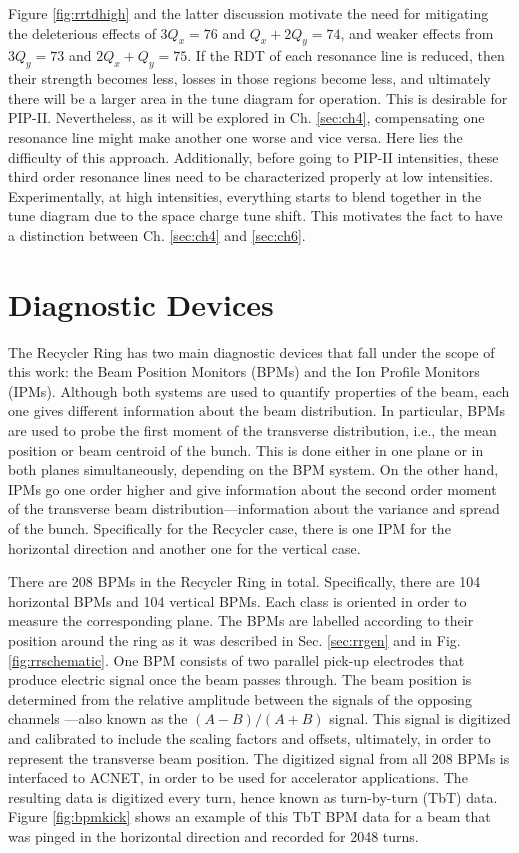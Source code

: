 Figure \ref{fig:rrtdhigh} and the latter discussion motivate the need for mitigating the deleterious effects of $3 Q_x=76$ and $Q_x+2Q_y=74$, and weaker effects from $3 Q_y=73$ and $2 Q_x+Q_y=75$. If the RDT of each resonance line is reduced, then their strength becomes less, losses in those regions become less, and ultimately there will be a larger area in the tune diagram for operation. This is desirable for PIP-II. Nevertheless, as it will be explored in Ch. \ref{sec:ch4}, compensating one resonance line might make another one worse and vice versa. Here lies the difficulty of this approach. Additionally, before going to PIP-II intensities, these third order resonance lines need to be characterized properly at low intensities. Experimentally, at high intensities, everything starts to blend together in the tune diagram due to the space charge tune shift. This motivates the fact to have a distinction between Ch. \ref{sec:ch4} and \ref{sec:ch6}.    

\section{\label{sec:diagnostic}Diagnostic Devices}

The Recycler Ring has two main diagnostic devices that fall under the scope of this work: the Beam Position Monitors (BPMs) and the Ion Profile Monitors (IPMs). Although both systems are used to quantify properties of the beam, each one gives different information about the beam distribution. In particular, BPMs are used to probe the first moment of the transverse distribution, i.e., the mean position or beam centroid of the bunch. This is done either in one plane or in both planes simultaneously, depending on the BPM system. On the other hand, IPMs go one order higher and give information about the second order moment of the transverse beam distribution---information about the variance and spread of the bunch. Specifically for the Recycler case, there is one IPM for the horizontal direction and another one for the vertical case.

There are 208 BPMs in the Recycler Ring in total. Specifically, there are 104 horizontal BPMs and 104 vertical BPMs. Each class is oriented in order to measure the corresponding plane. The BPMs are labelled according to their position around the ring as it was described in Sec. \ref{sec:rrgen} and in Fig. \ref{fig:rrschematic}. One BPM consists of two parallel pick-up electrodes that produce electric signal once the beam passes through. The beam position is determined from the relative amplitude between the signals of the opposing channels \cite{rrbpms}---also known as the $(A-B)/(A+B)$ signal. This signal is digitized and calibrated to include the scaling factors and offsets, ultimately, in order to represent the transverse beam position. The digitized signal from all 208 BPMs is interfaced to ACNET, in order to be used for accelerator applications. The resulting data is digitized every turn, hence known as turn-by-turn (TbT) data. Figure \ref{fig:bpmkick} shows an example of this TbT BPM data for a beam that was pinged in the horizontal direction and recorded for 2048 turns.      


